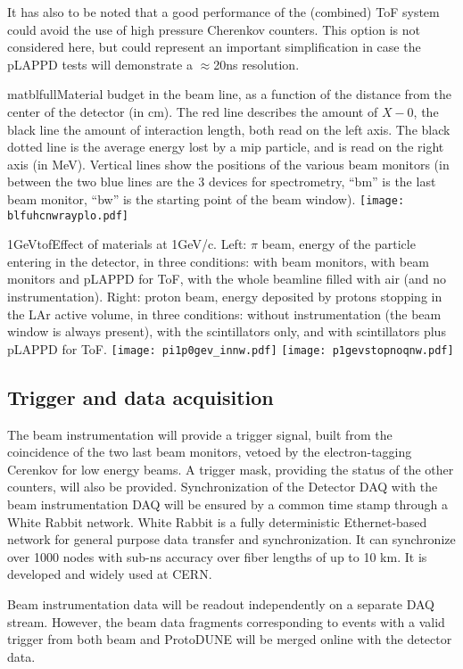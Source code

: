 It has also to be noted that a good performance of the (combined) ToF system could avoid the use of high pressure  Cherenkov counters. This option is not considered here, but could
represent an important simplification  in case the pLAPPD tests will demonstrate a $\approx$20ns resolution.
 \begin{cdrfigure}{matblfull}{Material budget in the beam line, as a function of the distance from the center of the detector (in cm). The red line describes the amount of $X-0$, the black line the amount of interaction length, both read on the left axis. The black dotted line is the average energy lost by a mip particle, and is read on the right axis (in MeV). Vertical lines show the positions of the various beam monitors (in between the two blue lines are the 3 devices for spectrometry, ``bm'' is the last beam monitor, ``bw'' is the starting point of the beam window).}  
\texttt{[image: blfuhcnwrayplo.pdf]}
\end{cdrfigure}
%
 \begin{cdrfigure}{1GeVtof}{Effect of materials at  1GeV/c. Left: $\pi$ beam, energy of the particle entering in the detector, in three conditions: with  beam monitors, with beam monitors and pLAPPD for ToF, with the whole beamline filled with air (and no instrumentation). Right: proton beam, energy deposited by protons stopping in the LAr active volume, in three conditions: without instrumentation (the beam window is always present), with the scintillators only, and with scintillators plus pLAPPD for ToF.  }
\texttt{[image: pi1p0gev\_innw.pdf]}
\texttt{[image: p1gevstopnoqnw.pdf]}
\end{cdrfigure}

\subsection {Trigger and data acquisition}
The beam instrumentation will provide a trigger signal, built from the coincidence of the two last beam monitors, vetoed by the electron-tagging Cerenkov for low energy beams. A trigger mask, providing the status of the other counters, will also be provided. 
 Synchronization of the Detector DAQ with the beam instrumentation DAQ will be ensured by a common time stamp through a White Rabbit network.
 White Rabbit is a fully deterministic Ethernet-based network for general purpose data transfer and synchronization. It can synchronize over 1000 nodes with sub-ns accuracy over fiber lengths of up to 10 km. It is developed and widely used at CERN.

Beam instrumentation data will be readout independently on a separate DAQ stream. However,  
the beam data fragments corresponding to  events with a valid trigger from both beam and ProtoDUNE will be merged online with the detector data.
 